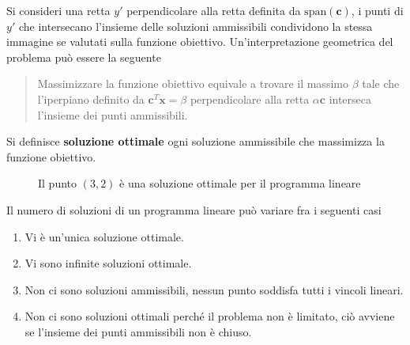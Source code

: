 \documentclass[10pt, letterpaper]{report}
\begin{document}
\begin{figure}[h]
\end{figure}
Si consideri una retta $y'$ perpendicolare alla retta definita da $\text{span}(\mathbf c)$, i punti di $y'$ che intersecano l'insieme delle soluzioni ammissibili condividono la stessa immagine se valutati sulla funzione obiettivo. Un'interpretazione geometrica del problema può essere la seguente\begin{quotation}
    Massimizzare la funzione obiettivo equivale a trovare il massimo $\beta$ tale che l'iperpiano definito da $\mathbf c^T\mathbf x = \beta$ perpendicolare alla retta $\alpha \mathbf c$ interseca l'insieme dei punti ammissibili.
\end{quotation}
Si definisce \textbf{soluzione ottimale} ogni soluzione ammissibile che massimizza la funzione obiettivo.
\begin{figure}[h]
    \caption{Il punto $(3,2)$ è una soluzione ottimale per il programma lineare}
        \label{LP_esempio3}
\end{figure}
Il numero di soluzioni di un programma lineare può variare fra i seguenti casi\begin{enumerate}
    \item Vi è un'unica soluzione ottimale.
    \item Vi sono infinite soluzioni ottimale.
    \item Non ci sono soluzioni ammissibili, nessun punto soddisfa tutti i vincoli lineari.
    \item Non ci sono soluzioni ottimali perché il problema non è limitato, ciò avviene se l'insieme dei punti ammissibili non è chiuso.
\end{enumerate}
\end{document}
